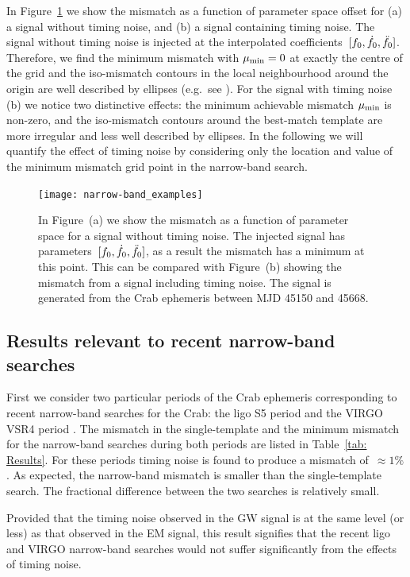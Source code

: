 \documentclass[../full_thesis/full_thesis.tex]{subfiles}
\begin{document}
In Figure~\ref{fig: narrow-band example} we show the mismatch as a function of
parameter space offset for (a) a signal without timing noise, and (b) a signal
containing timing noise. The signal without timing noise is injected at the
interpolated coefficients~$[f_{0}, \dot{f}_{0}, \ddot{f}_{0}]$.  Therefore, we find
the minimum mismatch with $\mu_{\mathrm{min}}=0$ at exactly the centre of the grid and the
iso-mismatch contours in the local neighbourhood around the origin are well
described by ellipses (e.g.\ see \citet{Prix2007}).  For the signal with timing
noise (b) we notice two distinctive effects: the minimum achievable mismatch
$\mu_{\mathrm{min}}$ is non-zero, and the iso-mismatch contours around the best-match
template are more irregular and less well described by ellipses.  In the
following we will quantify the effect of timing noise by considering only the
location and value of the minimum mismatch grid point in the narrow-band
search.
\begin{figure}[htb]
\centering
\texttt{[image: narrow-band\_examples]}
\caption{In Figure~(a) we show the mismatch as a function of parameter space
    for a signal without timing noise. The injected signal has
    parameters~$[f_{0}, \dot{f}_{0}, \ddot{f}_{0}]$, as a result the mismatch has
    a minimum at this point. This can be compared with Figure~(b) showing the
mismatch from a signal including timing noise. The signal is generated from the
Crab ephemeris between MJD 45150 and 45668.}
\label{fig: narrow-band example}
\end{figure}


\subsection{Results relevant to recent narrow-band searches}

First we consider two particular periods of the Crab ephemeris corresponding to
recent narrow-band searches for the Crab: the ligo S5 period \citep{ligo2008}
and the VIRGO VSR4 period \citep{ligo2015}. The mismatch in the single-template
and the minimum mismatch for the narrow-band searches during both periods are
listed in Table~\ref{tab: Results}. For these periods timing noise is
found to produce a mismatch of~$\approx 1\%$. As expected, the narrow-band
mismatch is smaller than the single-template search. The fractional difference
between the two searches is relatively small.

Provided that the timing noise observed in the GW signal is at the same level
(or less) as that observed in the EM signal, this result signifies that the
recent ligo and VIRGO narrow-band searches would not suffer significantly
from the effects of timing noise.
\end{document}
